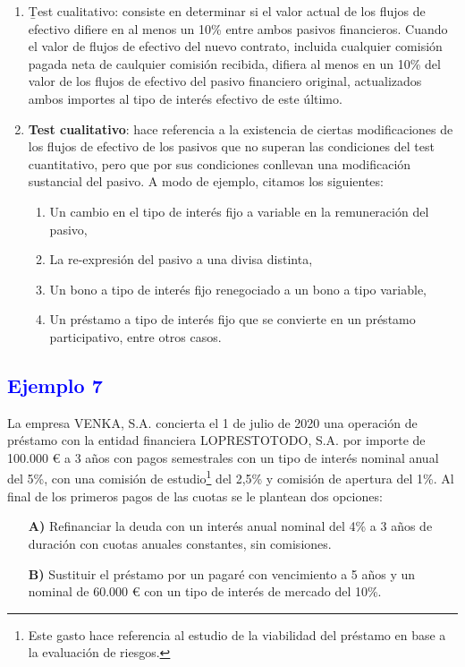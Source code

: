 \begin{enumerate}[label=\arabic*)]
    \item \b{Test cualitativo}: consiste en determinar si el valor actual de los flujos de efectivo difiere en al menos un 10\% entre ambos pasivos financieros. Cuando el valor de flujos de efectivo del nuevo contrato, incluida cualquier comisión pagada neta de caulquier comisión recibida, difiera al menos en un 10\% del valor de los flujos de efectivo del pasivo financiero original, actualizados ambos importes al tipo de interés efectivo de este último.
    \item \textbf{Test cualitativo}: hace referencia a la existencia de ciertas modificaciones de los flujos de efectivo de los pasivos que no superan las condiciones del test cuantitativo, pero que por sus condiciones conllevan una modificación sustancial del pasivo. A modo de ejemplo, citamos los siguientes:
    \begin{enumerate}[label=$\rightarrow$]
        \item Un cambio en el tipo de interés fijo a variable en la remuneración del pasivo,
        \item La re-expresión del pasivo a una divisa distinta,
        \item Un bono a tipo de interés fijo renegociado a un bono a tipo variable,
        \item Un préstamo a tipo de interés fijo que se convierte en un préstamo participativo, entre otros casos.
    \end{enumerate}
\end{enumerate}

\newpage
\subsection*{\textcolor{blue}{Ejemplo 7}}

La empresa VENKA, S.A. concierta el 1 de julio de 2020 una operación de préstamo con la entidad financiera LOPRESTOTODO, S.A. por importe de 100.000 € a 3 años con pagos semestrales con un tipo de interés nominal anual del 5\%, con una comisión de estudio\footnote{Este gasto hace referencia al estudio de la viabilidad del préstamo en base a la evaluación de riesgos.} del 2,5\% y comisión de apertura del 1\%. Al final de los primeros pagos de las cuotas se le plantean dos opciones:

\begin{itemize}
    \item[\textbf{A)}] Refinanciar la deuda con un interés anual nominal del 4\% a 3 años de duración con cuotas anuales constantes, sin comisiones.
    \item[\textbf{B)}] Sustituir el préstamo por un pagaré con vencimiento a 5 años y un nominal de 60.000 € con un tipo de interés de mercado del 10\%.
\end{itemize}

